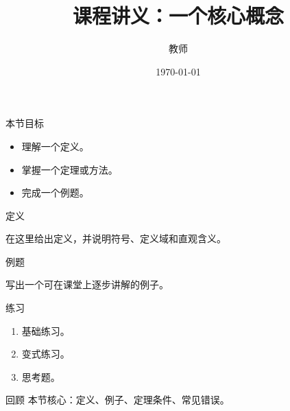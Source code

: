 \documentclass[10pt,aspectratio=169]{ctexbeamer}
\title{课程讲义：一个核心概念}
\author{教师}
\date{\today}
\begin{document}
\begin{frame}\titlepage\end{frame}

\begin{frame}{本节目标}
  \begin{itemize}
    \item 理解一个定义。
    \item 掌握一个定理或方法。
    \item 完成一个例题。
  \end{itemize}
\end{frame}

\begin{frame}{定义}
  \begin{definition}
    在这里给出定义，并说明符号、定义域和直观含义。
  \end{definition}
\end{frame}

\begin{frame}{例题}
  \begin{example}
    写出一个可在课堂上逐步讲解的例子。
  \end{example}
\end{frame}

\begin{frame}{练习}
  \begin{enumerate}
    \item 基础练习。
    \item 变式练习。
    \item 思考题。
  \end{enumerate}
\end{frame}

\begin{frame}{回顾}
  本节核心：定义、例子、定理条件、常见错误。
\end{frame}
\end{document}
